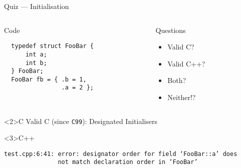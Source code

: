 \documentclass[presentation,aspectratio=169]{beamer}
\begin{document}
\begin{frame}[fragile,label={sec:org23c4234}]{Quiz — Initialisation}
 \begin{columns}
\begin{column}{0.48\columnwidth}
\begin{block}{Code}
\begin{verbatim}
  typedef struct FooBar {
      int a;
      int b;
  } FooBar;
  FooBar fb = { .b = 1,
                .a = 2 };
\end{verbatim}
\end{block}
\end{column}

\begin{column}{0.48\columnwidth}
\begin{block}{Questions}
\begin{itemize}
\item Valid C?
\item Valid C++?
\item Both?
\item Neither!?
\end{itemize}
\end{block}
\end{column}
\end{columns}

\begin{block}<2>{C}
Valid C (since \texttt{C99}): Designated Initialisers
\end{block}

\vspace{-1cm}
\begin{block}<3>{C++}
\begin{verbatim}
test.cpp:6:41: error: designator order for field ‘FooBar::a’ does
               not match declaration order in ‘FooBar’
\end{verbatim}
\end{block}
\end{frame}

\end{document}
